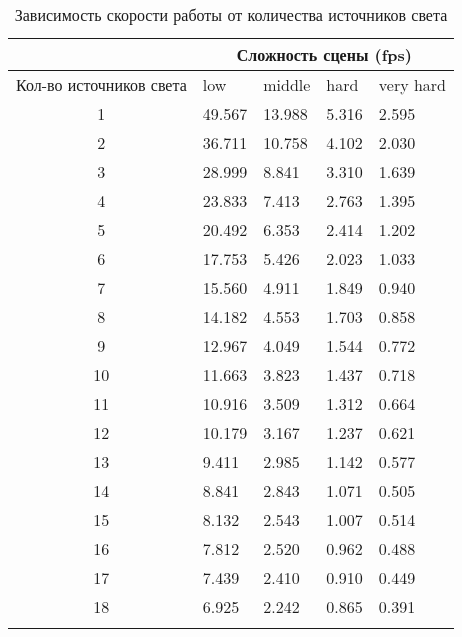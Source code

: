 \begin{center}
\begin{longtable}{|c|p{2cm}|p{2cm}|p{2cm}|p{2cm}|}
\hline & \multicolumn{4}{c|}{Сложность сцены (fps)} \\ 
\hline Кол-во источников света & low & middle & hard &  very hard\\ 
\hline 1 &  49.567 & 13.988 & 5.316 & 2.595 \\ 
\hline 2 &  36.711 & 10.758 & 4.102 & 2.030 \\ 
\hline 3 &  28.999 & 8.841 & 3.310 & 1.639 \\ 
\hline 4 &  23.833 & 7.413 & 2.763 & 1.395 \\ 
\hline 5 &  20.492 & 6.353 & 2.414 & 1.202 \\ 
\hline 6 &  17.753 & 5.426 & 2.023 & 1.033 \\ 
\hline 7 &  15.560 & 4.911 & 1.849 & 0.940 \\ 
\hline 8 &  14.182 & 4.553 & 1.703 & 0.858 \\ 
\hline 9 &  12.967 & 4.049 & 1.544 & 0.772 \\ 
\hline 10 &  11.663 & 3.823 & 1.437 & 0.718 \\ 
\hline 11 &  10.916 & 3.509 & 1.312 & 0.664 \\ 
\hline 12 &  10.179 & 3.167 & 1.237 & 0.621 \\ 
\hline 13 &  9.411 & 2.985 & 1.142 & 0.577 \\ 
\hline 14 &  8.841 & 2.843 & 1.071 & 0.505 \\ 
\hline 15 &  8.132 & 2.543 & 1.007 & 0.514 \\ 
\hline 16 &  7.812 & 2.520 & 0.962 & 0.488 \\ 
\hline 17 &  7.439 & 2.410 & 0.910 & 0.449 \\ 
\hline 18 &  6.925 & 2.242 & 0.865 & 0.391 \\ 
\hline
\caption{Зависимость скорости работы от количества источников света}\label{tab:performance_light}\end{longtable}
\end{center}

